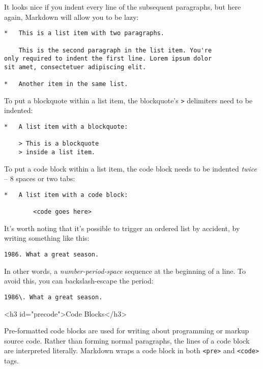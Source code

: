 It looks nice if you indent every line of the subsequent
paragraphs, but here again, Markdown will allow you to be
lazy:

\begin{lstlisting}
*   This is a list item with two paragraphs.

    This is the second paragraph in the list item. You're
only required to indent the first line. Lorem ipsum dolor
sit amet, consectetuer adipiscing elit.

*   Another item in the same list.
\end{lstlisting}




To put a blockquote within a list item, the blockquote's \texttt{>}
delimiters need to be indented:

\begin{lstlisting}
*   A list item with a blockquote:

    > This is a blockquote
    > inside a list item.
\end{lstlisting}




To put a code block within a list item, the code block needs
to be indented \emph{twice} -- 8 spaces or two tabs:

\begin{lstlisting}
*   A list item with a code block:

        <code goes here>
\end{lstlisting}




It's worth noting that it's possible to trigger an ordered list by
accident, by writing something like this:

\begin{lstlisting}
1986. What a great season.
\end{lstlisting}




In other words, a \emph{number-period-space} sequence at the beginning of a
line. To avoid this, you can backslash-escape the period:

\begin{lstlisting}
1986\. What a great season.
\end{lstlisting}


<h3 id="precode">Code Blocks</h3>



Pre-formatted code blocks are used for writing about programming or
markup source code. Rather than forming normal paragraphs, the lines
of a code block are interpreted literally. Markdown wraps a code block
in both \texttt{<pre>} and \texttt{<code>} tags.



